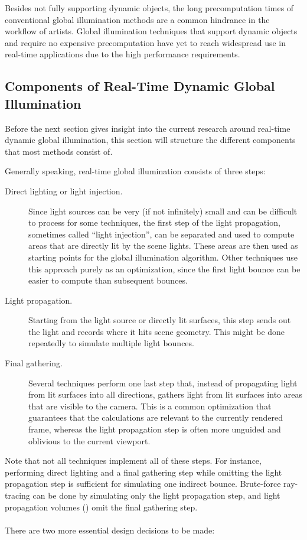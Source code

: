 Besides not fully supporting dynamic objects, the long precomputation times of conventional global illumination methods are a common hindrance in the workflow of artists. Global illumination techniques that support dynamic objects and require no expensive precomputation have yet to reach widespread use in real-time applications due to the high performance requirements.


\subsection{Components of Real-Time Dynamic Global Illumination}
\label{sec:intro:gi:components}

Before the next section gives insight into the current research around real-time dynamic global illumination, this section will structure the different components that most methods consist of.

Generally speaking, real-time global illumination consists of three steps:

\begin{description}
    \item[Direct lighting or light injection.] Since light sources can be very (if not infinitely) small and can be difficult to process for some techniques, the first step of the light propagation, sometimes called ``light injection'', can be separated and used to compute areas that are directly lit by the scene lights. These areas are then used as starting points for the global illumination algorithm. Other techniques use this approach purely as an optimization, since the first light bounce can be easier to compute than subsequent bounces.
    \item[Light propagation.] Starting from the light source or directly lit surfaces, this step sends out the light and records where it hits scene geometry. This might be done repeatedly to simulate multiple light bounces.
    \item[Final gathering.] Several techniques perform one last step that, instead of propagating light from lit surfaces into all directions, gathers light from lit surfaces into areas that are visible to the camera. This is a common optimization that guarantees that the calculations are relevant to the currently rendered frame, whereas the light propagation step is often more unguided and oblivious to the current viewport.
\end{description}%
%
Note that not all techniques implement all of these steps. For instance, performing direct lighting and a final gathering step while omitting the light propagation step is sufficient for simulating one indirect bounce. Brute-force ray-tracing can be done by simulating only the light propagation step, and light propagation volumes () omit the final gathering step.
\\
\\
There are two more essential design decisions to be made:

